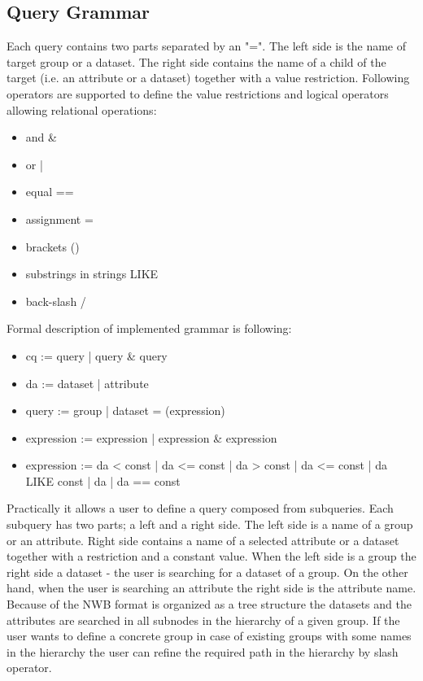 \documentclass[utf8]{frontiersSCNS} %
\begin{document}
\subsection{Query Grammar}
\label{Query_Grammar}

Each query contains two parts separated by an "=". The left side is the name of target group or a dataset. The right side contains the name of a child of the target (i.e. an attribute or a dataset) together with a value restriction. Following operators are supported to define the value restrictions and logical operators allowing relational operations:

\begin{itemize}
 \item and \&
 \item or  |
 \item equal ==
 \item assignment =
 \item brackets ()
 \item substrings in strings LIKE
 \item back-slash /
\end{itemize}

Formal description of implemented grammar is following:

\begin{itemize}
\item cq := query | query \& query
\item da := dataset | attribute
\item query := group | dataset = (expression)
\item expression := expression | expression \& expression
\item expression := da < const | da <= const | da > const | da <= const | da LIKE const | da | da == const 
\end{itemize}

Practically it allows a user to define a query composed from subqueries. Each subquery has two parts; a left and a right side. The left side is a name of a group or an attribute. Right side contains a name of a selected attribute or a dataset together with a restriction and a constant value. When the left side is a group the right side a dataset - the user is searching for a dataset of a group. On the other hand, when the user is searching an attribute the right side is the attribute name. Because of the NWB format is organized as a tree structure the datasets and the attributes are searched in all subnodes in the hierarchy of a given group. If the user wants to define a concrete group in case of existing groups with some names in the hierarchy the user can refine the required path in the hierarchy by slash operator.
\end{document}
